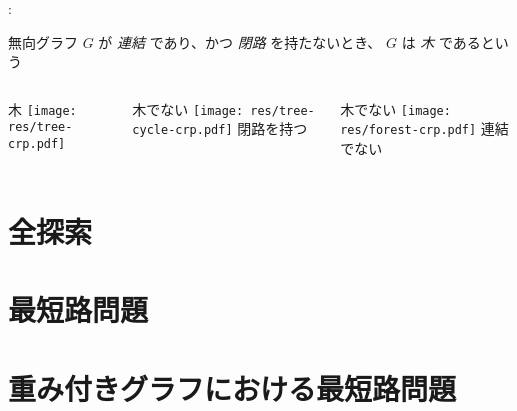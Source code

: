 \documentclass[dvipdfmx]{beamer}
\begin{document}
\begin{frame}{\insertsection: \insertsubsection}
  \begin{definition}
    無向グラフ $G$ が \emph{連結} であり、かつ \emph{閉路} を持たないとき、
    $G$ は \emph{木} であるという
  \end{definition}
  \begin{columns}[t]
    \begin{column}{0.3\linewidth}
      \begin{block}{木}
        \centering
        \texttt{[image: res/tree-crp.pdf]}
      \end{block}
    \end{column}
    \hfill
    \begin{column}{0.3\linewidth}
      \begin{block}{木でない}
        \centering
        \texttt{[image: res/tree-cycle-crp.pdf]}
        閉路を持つ
      \end{block}
    \end{column}
    \hfill
    \begin{column}{0.3\linewidth}
      \begin{block}{木でない}
        \centering
        \texttt{[image: res/forest-crp.pdf]}
        連結でない
      \end{block}
    \end{column}
  \end{columns}
\end{frame}

\section{全探索}

\section{最短路問題}

\section{重み付きグラフにおける最短路問題}
\end{document}
